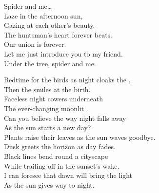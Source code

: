 Spider and me… \\

Laze in the afternoon sun, \\
Gazing at each other's beauty. \\
The huntsman's heart forever beats. \\
Our union is forever. \\

Let me just introduce you to my friend. \\
Under the tree, spider and me. \\









Bedtime for the birds as night cloaks the . \\
Then the  smiles at the  birth. \\
Faceless night cowers underneath \\
The ever-changing moonlit . \\
Can you believe the way night falls away \\
As the sun starts a new day? \\

Plants raise their leaves as the sun waves goodbye. \\
Dusk greets the horizon as day fades. \\
Black lines bend round a cityscape \\
While trailing off in the sunset's wake. \\
I can foresee that dawn will bring the light \\
As the sun gives way to night. \\




